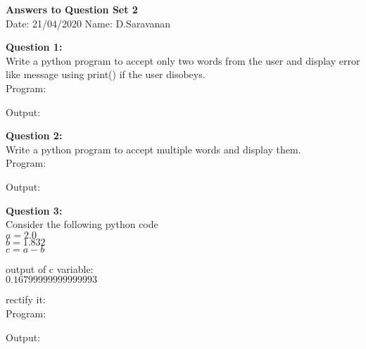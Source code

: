 \documentclass[a4paper,11pt,openright]{report}
\begin{document}
\singlespacing
\pagestyle{empty}

\begin{center}
\textbf{Answers to Question Set 2} \\
Date: 21/04/2020 \hspace{2mm} Name: D.Saravanan
\end{center}

\textbf{Question 1:} \\
Write a python program to accept only two words from the user and display error like
message using print() if the user disobeys. \\

Program: 


\vspace{5px}

Output:


\vspace{20px}

\textbf{Question 2:} \\
Write a python program to accept multiple words and display them. \\

Program:


\vspace{5px}

Output:


\vspace{20px}

\textbf{Question 3:} \\
Consider the following python code \\
$a = 2.0$ \\
$b = 1.832$ \\ 
$c = a-b$

\vspace{5px}

output of c variable: \\
$0.16799999999999993$ \\

\vspace{5px}

rectify it: \\

Program:


\vspace{5px}

Output:

\end{document}
